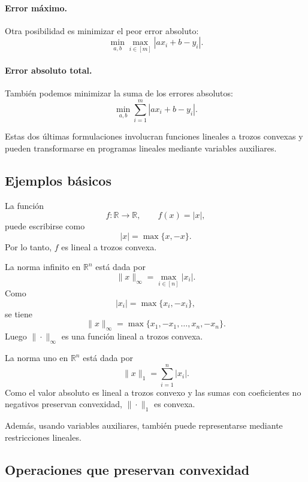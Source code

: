 \paragraph{Error máximo.}
Otra posibilidad es minimizar el peor error absoluto:
\[
    \min_{a,b}
    \max_{i\in[m]}
    |ax_i+b-y_i|.
\]

\paragraph{Error absoluto total.}
También podemos minimizar la suma de los errores absolutos:
\[
    \min_{a,b}
    \sum_{i=1}^{m}
    |ax_i+b-y_i|.
\]

Estas dos últimas formulaciones involucran funciones lineales a trozos convexas y pueden transformarse en programas lineales mediante variables auxiliares.

\subsection{Ejemplos básicos}

\begin{example}
La función
\[
    f:\mathbb{R}\to\mathbb{R},
    \qquad
    f(x)=|x|,
\]
puede escribirse como
\[
    |x|
    =
    \max\{x,-x\}.
\]
Por lo tanto, \(f\) es lineal a trozos convexa.
\end{example}

\begin{example}
La norma infinito en \(\mathbb{R}^n\) está dada por
\[
    \|x\|_\infty
    =
    \max_{i\in[n]}|x_i|.
\]
Como
\[
    |x_i|=\max\{x_i,-x_i\},
\]
se tiene
\[
    \|x\|_\infty
    =
    \max\{x_1,-x_1,\dots,x_n,-x_n\}.
\]
Luego \(\|\cdot\|_\infty\) es una función lineal a trozos convexa.
\end{example}

\begin{example}
La norma uno en \(\mathbb{R}^n\) está dada por
\[
    \|x\|_1
    =
    \sum_{i=1}^{n}|x_i|.
\]
Como el valor absoluto es lineal a trozos convexo y las sumas con coeficientes no negativos preservan convexidad, \(\|\cdot\|_1\) es convexa.

Además, usando variables auxiliares, también puede representarse mediante restricciones lineales.
\end{example}

\subsection{Operaciones que preservan convexidad}

